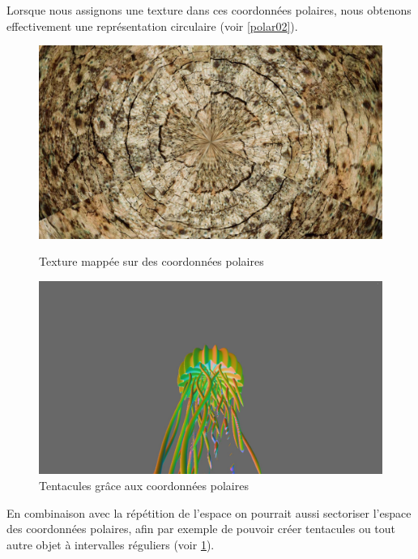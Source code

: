 Lorsque nous assignons une texture dans ces coordonnées polaires, nous obtenons effectivement une représentation circulaire (voir \ref{polar02}). 

\begin{figure}[h]
  \begin{minipage}[b]{0.45\linewidth}
    \centering
    \includegraphics[width=\linewidth]{images/polar02.JPG}
    \caption{Texture mappée sur des coordonnées polaires}
    \label{polar02}
  \end{minipage}
  \hspace{0.1\linewidth} %
  \begin{minipage}[b]{0.45\linewidth}
    \centering
    \includegraphics[width=\linewidth]{images/meduse/meduse_06_1.JPG}
    \caption{Tentacules grâce aux coordonnées polaires}
    \label{tent01}
  \end{minipage}
\end{figure}


En combinaison avec la répétition de l'espace on pourrait aussi sectoriser l'espace des coordonnées polaires, afin par exemple de pouvoir créer tentacules ou tout autre objet à intervalles réguliers (voir \ref{tent01}).



